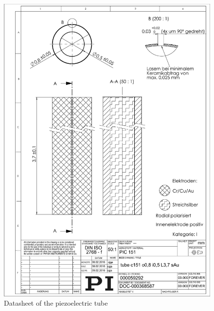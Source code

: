 \begin{figure}[h!]\centering \includegraphics[width=16cm]{appendix/piezo.pdf}
      \caption{Datasheet of the piezoelectric tube}
\end{figure}

